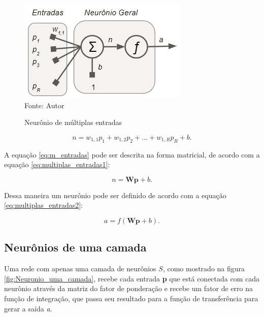 \documentclass[
	12pt,				%
    oneside,			%
	a4paper,			%
	english,			%
	french,				%
	spanish,			%
	brazil,				%
	]{abntex2}
\begin{document}
\begin{figure}[H]
    \centering
    \caption{Neurônio de múltiplas entradas}
    \includegraphics[scale=1]{Neuronio_multipla_entrada1}\\
    Fonte: Autor \hfill
    \label{fig:Neuronio_multipla_entrada}
\end{figure}

  \begin{equation}
    \textit{n} = \textit{\[w_{1,1}p_1 + w_{1,2}p_2 +...+ w_{1,R}p_R + b. \]}
    \label{eq:m_entradas}
  \end{equation}
  
  A equação \ref{eq:m_entradas} pode ser descrita na forma matricial, de acordo com a equação \ref{eq:multiplas_entradas1}:
  
 \begin{equation}
    \textit{n} = \textbf{Wp} + \textit{b}.
    \label{eq:multiplas_entradas1}
  \end{equation}
  
  Dessa maneira um neurônio pode ser definido de acordo com a equação \ref{eq:multiplas_entradas2}:
  
 \begin{equation}
    \textit{a} = \textit{f}(\textbf{Wp} + \textit{b}).
    \label{eq:multiplas_entradas2}
  \end{equation} 
  
\subsection {Neurônios de uma camada} 

Uma rede com apenas uma camada de neurônios $S$, como mostrado na figura \ref{fig:Neuronio_uma_camada}, recebe cada entrada \textbf{p} que está conectada com cada neurônio através da matriz do fator de ponderação e recebe um fator de erro na função de integração, que passa seu resultado para a função de transferência para gerar a saída \textit{a}.
\end{document}
